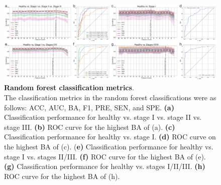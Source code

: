 \documentclass[11pt, a4paper, onecolumn, oneside]{report}
\begin{document}
            \begin{figure}[p]
                \centering
                \includegraphics[width=\linewidth]{Figures/Periodontitis/Figure_4.pdf}
                \caption[Random forest classification metrics]{\textbf{Random forest classification metrics}. \\
                    The classification metrics in the random forest classifications were as follows: ACC, AUC, BA, F1, PRE, SEN, and SPE. \textbf{(a)} Classification performance for healthy vs. stage I vs. stage II vs. stage III. \textbf{(b)} ROC curve for the highest BA of (a). \textbf{(c)} Classification performance for healthy vs. stage I. \textbf{(d)} ROC curve on the highest BA of (c). (\textbf{e)} Classification performance for healthy vs. stage I vs. stages II/III. \textbf{(f)} ROC curve for the highest BA of (e). \textbf{(g)} Classification performance for healthy vs. stages I/II/III. \textbf{(h)} ROC curve for the highest BA of (h).}
                \label{fig:Periodontitis-ML}
            \end{figure}
            \clearpage
\end{document}
